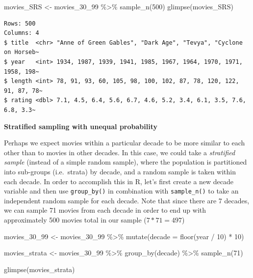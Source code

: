 \documentclass[
  letterpaper,
  DIV=11,
  numbers=noendperiod]{scrreprt}
\newenvironment{Shaded}{\begin{snugshade}}{\end{snugshade}}
\newcommand{\AttributeTok}[1]{\textcolor[rgb]{0.40,0.45,0.13}{#1}}
\newcommand{\DecValTok}[1]{\textcolor[rgb]{0.68,0.00,0.00}{#1}}
\newcommand{\FunctionTok}[1]{\textcolor[rgb]{0.28,0.35,0.67}{#1}}
\newcommand{\NormalTok}[1]{\textcolor[rgb]{0.00,0.23,0.31}{#1}}
\newcommand{\OtherTok}[1]{\textcolor[rgb]{0.00,0.23,0.31}{#1}}
\newcommand{\SpecialCharTok}[1]{\textcolor[rgb]{0.37,0.37,0.37}{#1}}
\theoremstyle{definition}
\theoremstyle{remark}
\begin{document}
\begin{Shaded}
\begin{Highlighting}[]
\NormalTok{movies\_SRS }\OtherTok{\textless{}{-}}\NormalTok{ movies\_30\_99 }\SpecialCharTok{\%\textgreater{}\%} 
  \FunctionTok{sample\_n}\NormalTok{(}\DecValTok{500}\NormalTok{)}
\FunctionTok{glimpse}\NormalTok{(movies\_SRS)}
\end{Highlighting}
\end{Shaded}

\begin{verbatim}
Rows: 500
Columns: 4
$ title  <chr> "Anne of Green Gables", "Dark Age", "Tevya", "Cyclone on Horseb~
$ year   <int> 1934, 1987, 1939, 1941, 1985, 1967, 1964, 1970, 1971, 1958, 198~
$ length <int> 78, 91, 93, 60, 105, 98, 100, 102, 87, 78, 120, 122, 91, 87, 78~
$ rating <dbl> 7.1, 4.5, 6.4, 5.6, 6.7, 4.6, 5.2, 3.4, 6.1, 3.5, 7.6, 6.8, 3.3~
\end{verbatim}

\textbf{Stratified sampling with unequal probability}

Perhaps we expect movies within a particular decade to be more similar
to each other than to movies in other decades. In this case, we could
take a \emph{stratified sample} (instead of a simple random sample),
where the population is partitioned into sub-groups (i.e.~strata) by
decade, and a random sample is taken within each decade. In order to
accomplish this in R, let's first create a new decade variable and then
use \texttt{group\_by()} in combination with \texttt{sample\_n()} to
take an independent random sample for each decade. Note that since there
are 7 decades, we can sample 71 movies from each decade in order to end
up with approximately 500 movies total in our sample (\(7 * 71 = 497\))

\begin{Shaded}
\begin{Highlighting}[]
\NormalTok{movies\_30\_99 }\OtherTok{\textless{}{-}}\NormalTok{ movies\_30\_99 }\SpecialCharTok{\%\textgreater{}\%} 
  \FunctionTok{mutate}\NormalTok{(}\AttributeTok{decade =} \FunctionTok{floor}\NormalTok{(year }\SpecialCharTok{/} \DecValTok{10}\NormalTok{) }\SpecialCharTok{*} \DecValTok{10}\NormalTok{) }

\NormalTok{movies\_strata }\OtherTok{\textless{}{-}}\NormalTok{ movies\_30\_99 }\SpecialCharTok{\%\textgreater{}\%} 
  \FunctionTok{group\_by}\NormalTok{(decade) }\SpecialCharTok{\%\textgreater{}\%} 
  \FunctionTok{sample\_n}\NormalTok{(}\DecValTok{71}\NormalTok{)}

\FunctionTok{glimpse}\NormalTok{(movies\_strata)}
\end{Highlighting}
\end{Shaded}
\end{document}
